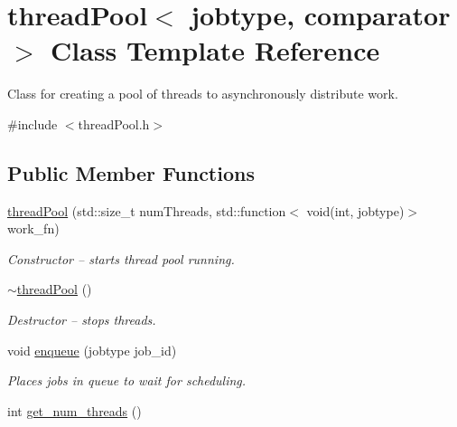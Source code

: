 \hypertarget{classthreadPool}{}\section{thread\+Pool$<$ jobtype, comparator $>$ Class Template Reference}
\label{classthreadPool}


Class for creating a pool of threads to asynchronously distribute work.  




{\ttfamily \#include $<$thread\+Pool.\+h$>$}

\subsection*{Public Member Functions}
\begin{DoxyCompactItemize}
\item 
\mbox{\label{classthreadPool_a9dec84c42aa3c3beee252f338ddc2d39}} 
\hyperlink{classthreadPool_a9dec84c42aa3c3beee252f338ddc2d39}{thread\+Pool} (std\+::size\+\_\+t num\+Threads, std\+::function$<$ void(int, jobtype)$>$ work\+\_\+fn)
\begin{DoxyCompactList}\small\item\em Constructor -- starts thread pool running. \end{DoxyCompactList}\item 
\mbox{\label{classthreadPool_abf95d0e451e758582920dc8ddf8a0602}} 
\hyperlink{classthreadPool_abf95d0e451e758582920dc8ddf8a0602}{$\sim$thread\+Pool} ()
\begin{DoxyCompactList}\small\item\em Destructor -- stops threads. \end{DoxyCompactList}\item 
void \hyperlink{classthreadPool_a8032717dcc11834427f874bc1efd6376}{enqueue} (jobtype job\+\_\+id)
\begin{DoxyCompactList}\small\item\em Places jobs in queue to wait for scheduling. \end{DoxyCompactList}\item 
\mbox{\label{classthreadPool_acbbf74c33481a258439be4d305f5f429}} 
int \hyperlink{classthreadPool_acbbf74c33481a258439be4d305f5f429}{get\+\_\+num\+\_\+threads} ()

\end{DoxyCompactItemize}
